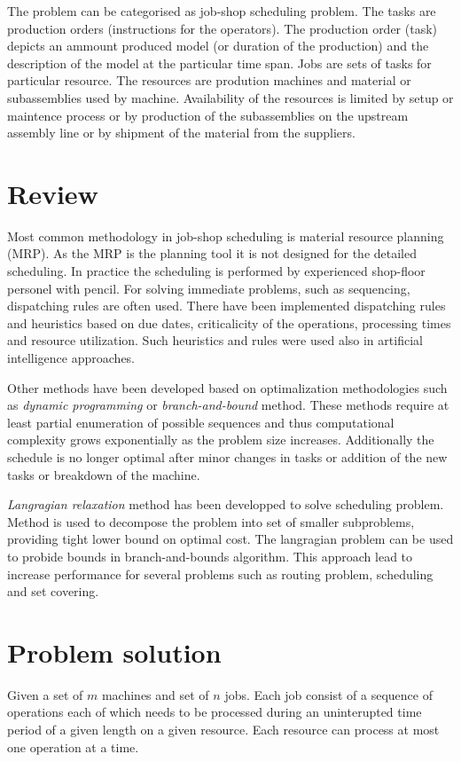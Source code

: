 \documentclass[a4paper,journal,twocolumn]{IEEEtran}
\begin{document}
The problem can be categorised as job-shop scheduling problem. The tasks are production orders (instructions for the operators).
The production order (task) depicts an ammount produced model (or duration of the production) and the description of the model
at the particular time span.
Jobs are sets of tasks for particular resource.
The resources are prodution machines and material or subassemblies used by machine.
Availability of the resources is limited by setup or maintence process or by production of the subassemblies
on the upstream assembly line or by shipment of the material from the suppliers.

\section{Review}
Most common methodology in job-shop scheduling is material resource planning (MRP). As the MRP is the planning tool it
is not designed for the detailed scheduling. In practice the scheduling is performed by experienced shop-floor
personel with pencil. 
For solving immediate problems, such as sequencing, dispatching rules are often used. 
There have been implemented dispatching rules and heuristics  based on  due dates, criticalicity of the operations, 
processing times and resource utilization. 
Such heuristics and rules were used also in artificial intelligence approaches.\cite{Hoi}

Other methods have been developed based on optimalization methodologies such as \emph{dynamic programming} or 
\emph{branch-and-bound} method.
These methods require at least partial enumeration of possible sequences and thus computational complexity grows exponentially
as the problem size increases. Additionally the schedule is no longer optimal after minor changes in tasks or addition of the 
new tasks or breakdown of the machine.\cite{Hoi}

\emph{Langragian relaxation} method has been developped to solve scheduling problem. 
Method is used to decompose the problem into set of smaller subproblems, 
providing tight lower bound on optimal cost.\cite{Hoi}
The langragian problem can be used to probide bounds in branch-and-bounds algorithm.
This approach lead to increase performance for several problems such as routing problem, scheduling and set covering.\cite{Fis}


\section{Problem solution}
Given a set of $m$ machines and set of $n$ jobs. Each job consist of a sequence of operations each of which needs 
to be processed during an uninterupted time period of a given length on a given resource. 
Each resource can process at most one operation at a time.
\end{document}
